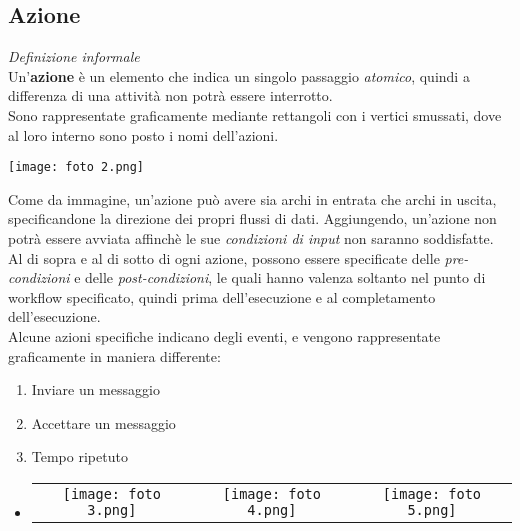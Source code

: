 \documentclass{article}
\begin{document}
\subsection*{Azione}
\large
\textit{Definizione informale}\\Un'\textbf{azione} è un elemento che indica un singolo passaggio \textit{atomico}, quindi a differenza di una attività non potrà essere interrotto.\vspace*{14pt}\\
Sono rappresentate graficamente mediante rettangoli con i vertici smussati, dove al loro interno sono posto i nomi dell'azioni.\\
\begin{center}
    \texttt{[image: foto 2.png]}
\end{center}
Come da immagine, un'azione può avere sia archi in entrata che archi in uscita, specificandone la direzione dei propri flussi di dati. Aggiungendo, un'azione non potrà essere avviata affinchè le sue \textit{condizioni di input} non saranno soddisfatte.\vspace*{14pt}\\
Al di sopra e al di sotto di ogni azione, possono essere specificate delle \textit{pre-condizioni} e delle \textit{post-condizioni}, le quali hanno valenza soltanto nel punto di workflow specificato, quindi prima dell'esecuzione e al completamento dell'esecuzione.\vspace*{14pt}\\
Alcune azioni specifiche indicano degli eventi, e vengono rappresentate graficamente in maniera differente:
\begin{enumerate}
    \renewcommand{\labelenumi}{-}
    \itemsep0em
    \item Inviare un messaggio
    \item Accettare un messaggio
    \item Tempo ripetuto 
\end{enumerate}
\begin{itemize}[label={ }]
    \renewcommand{\labelenumi}{-}
    \item 
    \begin{tabular}{c c c}
        \begin{minipage}[b]{0.3\textwidth}
            \texttt{[image: foto 3.png]}
        \end{minipage}
        &
        \begin{minipage}[b]{0.3\textwidth}
            \texttt{[image: foto 4.png]}
        \end{minipage}
        &
        \begin{minipage}[b]{0.3\textwidth}
            \texttt{[image: foto 5.png]}
        \end{minipage}
    \end{tabular}
\end{itemize}
\end{document}
